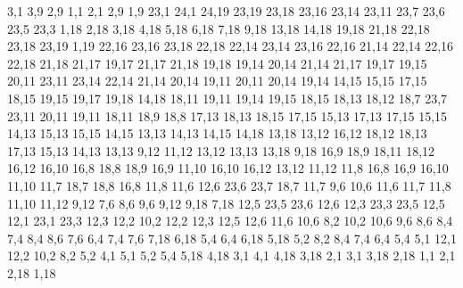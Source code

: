 3,1
3,9
2,9
%
1,1
2,1
2,9
1,9
23,1
24,1
24,19
23,19
23,18
23,16
23,14
23,11
23,7
23,6
23,5
23,3
%
1,18
2,18
3,18
4,18
5,18
6,18
7,18
9,18
13,18
14,18
19,18
21,18
22,18
23,18
23,19
1,19
%
22,16
23,16
23,18
22,18
%
22,14
23,14
23,16
22,16
%
21,14
22,14
22,16
22,18
21,18
21,17
%
19,17
21,17
21,18
19,18
%
19,14
20,14
21,14
21,17
19,17
19,15
%
20,11
23,11
23,14
22,14
21,14
20,14
%
19,11
20,11
20,14
19,14
%
14,15
15,15
17,15
18,15
19,15
19,17
19,18
14,18
%
18,11
19,11
19,14
19,15
18,15
18,13
18,12
%
18,7
23,7
23,11
20,11
19,11
18,11
18,9
18,8
%
17,13
18,13
18,15
17,15
%
15,13
17,13
17,15
15,15
%
14,13
15,13
15,15
14,15
%
13,13
14,13
14,15
14,18
13,18
%
13,12
16,12
18,12
18,13
17,13
15,13
14,13
13,13
%
9,12
11,12
13,12
13,13
13,18
9,18
%
16,9
18,9
18,11
18,12
16,12
16,10
%
16,8
18,8
18,9
16,9
%
11,10
16,10
16,12
13,12
11,12
%
11,8
16,8
16,9
16,10
11,10
%
11,7
18,7
18,8
16,8
11,8
%
11,6
12,6
23,6
23,7
18,7
11,7
%
9,6
10,6
11,6
11,7
11,8
11,10
11,12
9,12
%
7,6
8,6
9,6
9,12
9,18
7,18
%
12,5
23,5
23,6
12,6
%
12,3
23,3
23,5
12,5
%
12,1
23,1
23,3
12,3
12,2
%
10,2
12,2
12,3
12,5
12,6
11,6
10,6
%
8,2
10,2
10,6
9,6
8,6
8,4
%
7,4
8,4
8,6
7,6
%
6,4
7,4
7,6
7,18
6,18
%
5,4
6,4
6,18
5,18
%
5,2
8,2
8,4
7,4
6,4
5,4
%
5,1
12,1
12,2
10,2
8,2
5,2
%
4,1
5,1
5,2
5,4
5,18
4,18
%
3,1
4,1
4,18
3,18
%
2,1
3,1
3,18
2,18
%
1,1
2,1
2,18
1,18
